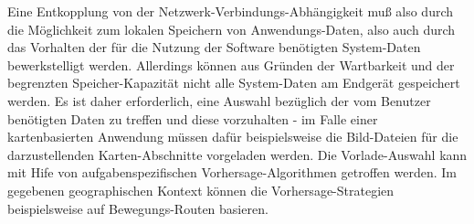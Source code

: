 \noindent
Eine Entkopplung von der Netzwerk-Verbindungs-Abhängigkeit muß also durch die Möglichkeit zum lokalen Speichern von Anwendungs-Daten, also auch durch das Vorhalten der für die Nutzung der Software benötigten System-Daten bewerkstelligt werden. Allerdings können aus Gründen der Wartbarkeit und der begrenzten Speicher-Kapazität nicht alle System-Daten am Endgerät gespeichert werden. Es ist daher erforderlich, eine Auswahl bezüglich der vom Benutzer benötigten Daten zu treffen und diese vorzuhalten - im Falle einer kartenbasierten Anwendung müssen dafür beispielsweise die Bild-Dateien für die darzustellenden Karten-Abschnitte vorgeladen werden. Die Vorlade-Auswahl kann mit Hife von aufgabenspezifischen Vorhersage-Algorithmen getroffen werden. Im gegebenen geographischen Kontext können die Vorhersage-Strategien beispielsweise auf Bewegungs-Routen basieren.




